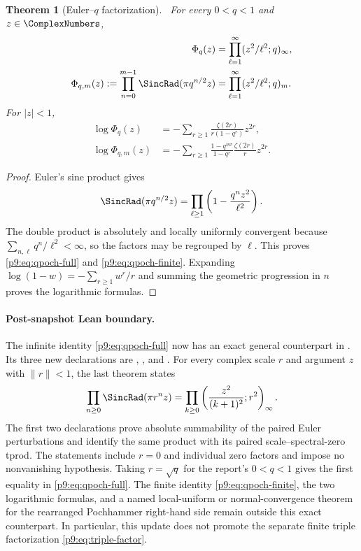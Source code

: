 \documentclass[11pt]{article}
\numberwithin{equation}{section}
\newtheorem{theorem}{Theorem}[section]
\theoremstyle{definition}
\theoremstyle{remark}
\begin{document}
\begin{theorem}[Euler--$q$ factorization]\label{p9:thm:qpoch-sinc}
\statusN\ For every $0<q<1$ and $z\in\ComplexNumbers$,
\begin{align}
 \Phi_q(z)&=\prod_{\ell=1}^{\infty}(z^2/\ell^2;q)_\infty,  \label{p9:eq:qpoch-full}\\
 \Phi_{q,m}(z):=\prod_{n=0}^{m-1}\SincRad(\pi q^{n/2}z)
 &=\prod_{\ell=1}^{\infty}(z^2/\ell^2;q)_m.                \label{p9:eq:qpoch-finite}
\end{align}
For $|z|<1$,
\begin{align}
 \log\Phi_q(z)
 &=-\sum_{r\ge1}\frac{\zeta(2r)}{r(1-q^r)}z^{2r},         \label{p9:eq:q-log-full}\\
 \log\Phi_{q,m}(z)
 &=-\sum_{r\ge1}\frac{1-q^{mr}}{1-q^r}\frac{\zeta(2r)}r z^{2r}. \label{p9:eq:q-log-finite}
\end{align}
\end{theorem}

\begin{proof}
Euler's sine product gives
\[
 \SincRad(\pi q^{n/2}z)=\prod_{\ell\ge1}\left(1-\frac{q^nz^2}{\ell^2}\right).
\]
The double product is absolutely and locally uniformly convergent because
$\sum_{n,\ell}q^n/\ell^2<\infty$, so the factors may be regrouped by $\ell$.  This proves
\eqref{p9:eq:qpoch-full} and \eqref{p9:eq:qpoch-finite}.  Expanding
$\log(1-w)=-\sum_{r\ge1}w^r/r$ and summing the geometric progression in $n$ proves the
logarithmic formulas.
\end{proof}

\paragraph{Post-snapshot Lean boundary.}
The infinite identity \eqref{p9:eq:qpoch-full} now has an exact general
counterpart in .  Its three new
declarations are
,
, and
.  For every
complex scale \(r\) and argument \(z\) with \(\lVert r\rVert<1\), the last
theorem states
\[
 \prod_{n\ge0}\SincRad(\pi r^n z)
 =\prod_{k\ge0}\left(\frac{z^2}{(k+1)^2};r^2\right)_\infty .
\]
The first two declarations prove absolute summability of the paired Euler
perturbations and identify the same product with its paired
scale--spectral-zero tprod.  The statements include \(r=0\) and individual
zero factors and impose no nonvanishing hypothesis.  Taking
\(r=\sqrt q\) for the report's \(0<q<1\) gives the first equality in
\eqref{p9:eq:qpoch-full}.  The finite identity
\eqref{p9:eq:qpoch-finite}, the two logarithmic formulas, and a named
local-uniform or normal-convergence theorem for the rearranged Pochhammer
right-hand side remain outside this exact counterpart.  In particular, this
update does not promote the separate finite triple factorization
\eqref{p9:eq:triple-factor}.
\end{document}
